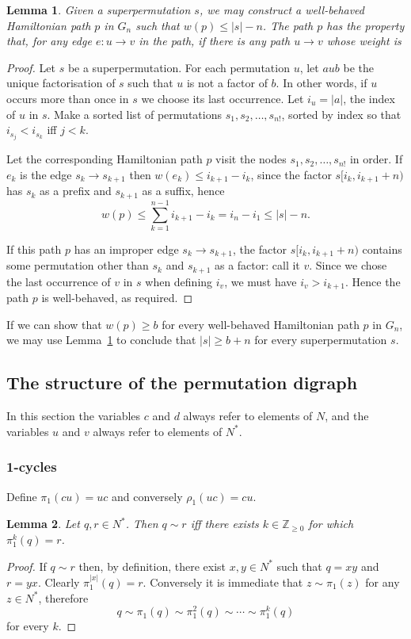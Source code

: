 \documentclass[a4paper]{article}
\newtheorem{lemma}{Lemma}
\theoremstyle{definition}
\theoremstyle{remark}
\begin{document}
\begin{lemma}\label{lemma:transfer}
    Given a superpermutation $s$, we may construct a well-behaved Hamiltonian path $p$ in $G_n$ such that $w(p) \le |s|-n$. The path $p$ has the property that, for any edge $e: u\to v$ in the path, if there is any path $u\to v$ whose weight is 
\end{lemma}
\begin{proof}
Let $s$ be a superpermutation. For each permutation $u$, let $aub$ be the unique factorisation of $s$ such that $u$ is not a factor of $b$. In other words, if $u$ occurs more than once in $s$ we choose its last occurrence. Let $i_u = |a|$, the index of $u$ in $s$. Make a sorted list of permutations $s_1, s_2, \dots, s_{n!}$, sorted by index so that $i_{s_j} < i_{s_k}$ iff $j < k$.

Let the corresponding Hamiltonian path $p$ visit the nodes $s_1, s_2, \dots, s_{n!}$ in order. If $e_k$ is the edge $s_k \to s_{k+1}$ then $w(e_k) \le i_{k+1} - i_k$, since the factor $s[i_k, i_{k+1} + n)$ has $s_k$ as a prefix and $s_{k+1}$ as a suffix, hence
\[
    w(p) \le \sum_{k=1}^{n-1} i_{k+1} - i_k = i_n - i_1 \le |s| - n.
\]

If this path $p$ has an improper edge $s_k \to s_{k+1}$, the factor $s[i_k, i_{k+1} + n)$ contains some permutation other than $s_k$ and $s_{k+1}$ as a factor: call it $v$. Since we chose the last occurrence of $v$ in $s$ when defining $i_v$, we must have $i_v > i_{k+1}$. Hence the path $p$ is well-behaved, as required.
\end{proof}

If we can show that $w(p) \ge b$ for every well-behaved Hamiltonian path $p$ in $G_n$, we may use Lemma~\ref{lemma:transfer} to conclude that $|s|\ge b+n$ for every superpermutation $s$.

\subsection{The structure of the permutation digraph}
In this section the variables $c$ and $d$ always refer to elements of $N$, and the variables $u$ and $v$ always refer to elements of $N^*$.
\subsubsection{1-cycles}
Define $\pi_1(cu) = uc$ and conversely $\rho_1(uc)=cu$.

\begin{lemma}\label{lem:pi1}
Let $q, r\in N^*$. Then $q\sim r$ iff there exists $k\in\mathbb{Z}_{\ge 0}$ for which $\pi_1^k(q)=r$.
\end{lemma}
\begin{proof}
If $q\sim r$ then, by definition, there exist $x, y\in N^*$ such that $q=xy$ and $r=yx$. Clearly $\pi_1^{|x|}(q)=r$. Conversely it is immediate that $z\sim\pi_1(z)$ for any $z\in N^*$, therefore
\[
    q \sim \pi_1(q) \sim \pi_1^2(q) \sim\cdots\sim \pi_1^k(q)
\]
for every $k$.
\end{proof}
\end{document}
